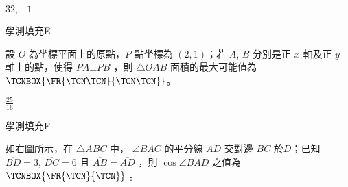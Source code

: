 \begin{QUESTIONS}
\begin{QUESTION}
        \begin{QTAGS}\end{QTAGS}
        \begin{QANS}
            $32, -1$
        \end{QANS}
        \begin{QSOLLIST}
        \end{QSOLLIST}
        \begin{QEMPTYSPACE}
        \end{QEMPTYSPACE}
    \end{QUESTION}
    \begin{QUESTION}
        \begin{ExamInfo}{94}{學測}{填充}{E}
        \end{ExamInfo}
        \begin{ExamAnsRateInfo}{13}{36}{3}{0}
        \end{ExamAnsRateInfo}
        \begin{QBODY}
            設 $O$ 為坐標平面上的原點，$P$ 點坐標為 $(2, 1)$；若 $A$, $B$ 分別是正 $x$-軸及正 $y$-軸上的點，使得 $PA \bot PB$ ，則 $\triangle OAB$ 面積的最大可能值為 $\TCNBOX{\FR{\TCN\TCN}{\TCN\TCN}}$。
        \end{QBODY}
        \begin{QFROMS}
        \end{QFROMS}
        \begin{QTAGS}\end{QTAGS}
        \begin{QANS}
            $\frac{25}{16}$
        \end{QANS}
        \begin{QSOLLIST}
        \end{QSOLLIST}
        \begin{QEMPTYSPACE}
        \end{QEMPTYSPACE}
    \end{QUESTION}
    \begin{QUESTION}
        \begin{ExamInfo}{94}{學測}{填充}{F}
        \end{ExamInfo}
        \begin{ExamAnsRateInfo}{17}{38}{8}{5}
        \end{ExamAnsRateInfo}
        \begin{QBODY}
            如右圖所示，在 $\triangle ABC$ 中， $\angle BAC$ 的平分線 $AD$ 交對邊 $BC$ 於$D$；已知 $\overline{BD}=3$, $\overline{DC} = 6$ 且 $\overline{AB} = \overline{AD}$ ，則 $\cos \angle BAD$ 之值為 $\TCNBOX{\FR{\TCN}{\TCN}}$ 。

\end{QBODY}
\end{QUESTION}
\end{QUESTIONS}
